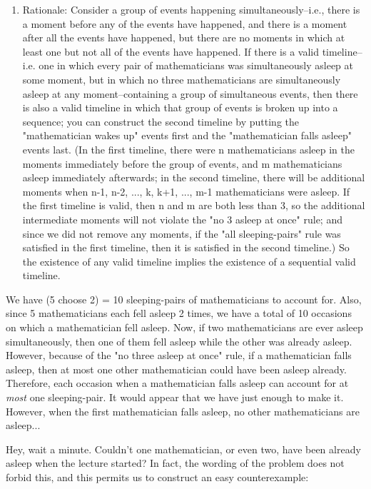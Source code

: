 \begin{enumerate}
 
            \begin{enumerate}[label=(\roman*)]
                \item Rationale: Consider a group of events happening simultaneously--i.e., there is a moment before any of the events have happened, and there is a moment after all the events have happened, but there are no moments in which at least one but not all of the events have happened.  If there is a valid timeline--i.e. one in which every pair of mathematicians was simultaneously asleep at some moment, but in which no three mathematicians are simultaneously asleep at any moment--containing a group of simultaneous events, then there is also a valid timeline in which that group of events is broken up into a sequence; you can construct the second timeline by putting the "mathematician wakes up" events first and the "mathematician falls asleep" events last.  (In the first timeline, there were n mathematicians asleep in the moments immediately before the group of events, and m mathematicians asleep immediately afterwards; in the second timeline, there will be additional moments when n-1, n-2, ..., k, k+1, ..., m-1 mathematicians were asleep.  If the first timeline is valid, then n and m are both less than 3, so the additional intermediate moments will not violate the "no 3 asleep at once" rule; and since we did not remove any moments, if the "all sleeping-pairs" rule was satisfied in the first timeline, then it is satisfied in the second timeline.)  So the existence of any valid timeline implies the existence of a sequential valid timeline.
            \end{enumerate}
            We have (5 choose 2) = 10 sleeping-pairs of mathematicians to account for.  Also, since 5 mathematicians each fell asleep 2 times, we have a total of 10 occasions on which a mathematician fell asleep.  Now, if two mathematicians are ever asleep simultaneously, then one of them fell asleep while the other was already asleep.  However, because of the "no three asleep at once" rule, if a mathematician falls asleep, then at most one other mathematician could have been asleep already.  Therefore, each occasion when a mathematician falls asleep can account for at \textit{most} one sleeping-pair.  It would appear that we have just enough to make it.  However, when the first mathematician falls asleep, no other mathematicians are asleep...

 Hey, wait a minute.  Couldn't one mathematician, or even two, have been already asleep when the lecture started?  In fact, the wording of the problem does not forbid this, and this permits us to construct an easy counterexample:


\end{enumerate}
